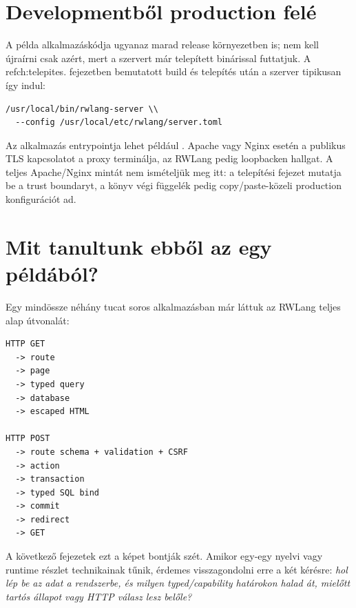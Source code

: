 \section{Developmentből production felé}

A példa alkalmazáskódja ugyanaz marad release környezetben is; nem kell újraírni csak azért, mert a szervert már telepített binárissal futtatjuk. A \\ref{ch:telepites}. fejezetben bemutatott build és telepítés után a szerver tipikusan így indul:

\begin{lstlisting}
/usr/local/bin/rwlang-server \\
  --config /usr/local/etc/rwlang/server.toml
\end{lstlisting}

Az alkalmazás entrypointja lehet például . Apache vagy Nginx esetén a publikus TLS kapcsolatot a proxy terminálja, az RWLang pedig loopbacken hallgat. A teljes Apache/Nginx mintát nem ismételjük meg itt: a telepítési fejezet mutatja be a trust boundaryt, a könyv végi függelék pedig copy/paste-közeli production konfigurációt ad.

\section{Mit tanultunk ebből az egy példából?}

Egy mindössze néhány tucat soros alkalmazásban már láttuk az RWLang teljes alap útvonalát:

\begin{lstlisting}
HTTP GET
  -> route
  -> page
  -> typed query
  -> database
  -> escaped HTML

HTTP POST
  -> route schema + validation + CSRF
  -> action
  -> transaction
  -> typed SQL bind
  -> commit
  -> redirect
  -> GET
\end{lstlisting}

A következő fejezetek ezt a képet bontják szét. Amikor egy-egy nyelvi vagy runtime részlet technikainak tűnik, érdemes visszagondolni erre a két kérésre: \emph{hol lép be az adat a rendszerbe, és milyen typed/capability határokon halad át, mielőtt tartós állapot vagy HTTP válasz lesz belőle?}
